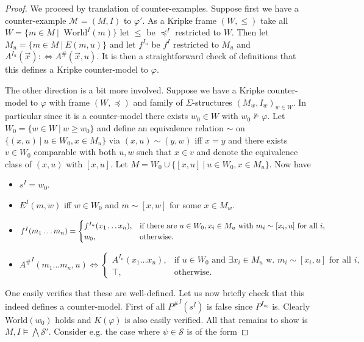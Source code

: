 \documentclass[a4paper,11pt]{report}
\theoremstyle{definition}
\theoremstyle{definition}
\theoremstyle{definition}
\theoremstyle{definition}
\theoremstyle{definition}
\theoremstyle{definition}
\theoremstyle{definition}
\begin{document}
	\begin{proof}
		We proceed by translation of counter-examples. Suppose first we have a counter-example $\mathcal M = (M, I)$ to $\varphi'$. As a Kripke frame $(W, \leq)$ take all $ W = \{m\in M\:|\:\text{ World}^I(m)\}$ let $\leq$ be $\preceq^I$ restricted to $W$. Then let $M_u = \{m\in M\:|\: E(m, u)\}$ and let $f^{I_u}$ be $f^I$ restricted to $M_u$ and $A^{I_u}(\vec x): \Leftrightarrow A^\#(\vec x, u)$. It is then a straightforward check of definitions that this defines a Kripke counter-model to $\varphi$.
		
		The other direction is a bit more involved. Suppose we have a Kripke counter-model to $\varphi$ with frame $(W, \preceq)$ and family of $\Sigma$-structures $(M_w, I_w)_{w\in W}$. In particular since it is a counter-model there exists $w_0\in W$ with $w_0\not\models\varphi$. Let $W_0 = \{w\in W\:|\: w\geq w_0\}$ and define an equivalence relation $\sim$ on $\{(x, u)\:|\:u\in W_0, x\in M_u\}$ via $(x, u)\sim (y, w)$ iff $x = y$ and there exists $v\in W_0$ comparable with both $u, w$ such that $x\in v$ and denote the equivalence class of $(x, u)$ with $[x, u]$. Let $M = W_0\cup \{[x, u]\:|\:u\in W_0, x\in M_u\}$.
		Now have
		\begin{itemize}
			\item $s^I = w_0$.
			\item $E^I(m, w)$ iff $w\in W_0$ and $m \sim [x, w]$ for some $x\in M_w$.
			\item $f^I(m_1\dots m_n) =\begin{cases}
				f^{I_u}(x_1\dots x_n), &\text{if there are $ u\in W_0, x_i\in M_u$ with $m_i\sim [x_i, u]$ for all $i$,}\\
				w_0, & \text{otherwise.}
			\end{cases}$
			\item ${A^\#}^I(m_1\dots m_n, u) \Leftrightarrow\begin{cases}
				A^{I_u}(x_1\dots x_n), &\text{if $u\in W_0$ and $\exists x_i\in M_u$ w. $m_i\sim [x_i, u]$ for all $i$,}\\
				\top, & \text{otherwise.}
			\end{cases}$
		\end{itemize}
		One easily verifies that these are well-defined. Let us now briefly check that this indeed defines a counter-model. First of all ${P^\#}^I(s^I)$ is false since $P^{I_{w_0}}$ is. Clearly World$(w_0)$ holds and $K(\varphi)$ is also easily verified. All that remains to show is $M, I\models\bigwedge\mathcal S'$. Consider e.g. the case where $\psi\in\mathcal S$ is of the form

\end{proof}
\end{document}
